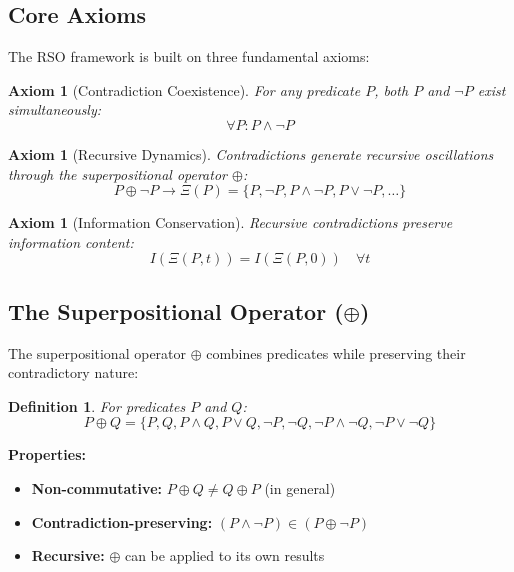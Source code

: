 \documentclass[11pt,a4paper]{article}
\newtheorem{definition}[theorem]{Definition}
\newtheorem{axiom}[theorem]{Axiom}
\begin{document}
\subsection{Core Axioms}

The RSO framework is built on three fundamental axioms:

\begin{axiom}[Contradiction Coexistence]
For any predicate $P$, both $P$ and $\neg P$ exist simultaneously:
\begin{equation}
\forall P: P \land \neg P
\end{equation}
\end{axiom}

\begin{axiom}[Recursive Dynamics]
Contradictions generate recursive oscillations through the superpositional operator $\oplus$:
\begin{equation}
P \oplus \neg P \rightarrow \Xi(P) = \{P, \neg P, P \land \neg P, P \lor \neg P, \ldots\}
\end{equation}
\end{axiom}

\begin{axiom}[Information Conservation]
Recursive contradictions preserve information content:
\begin{equation}
I(\Xi(P, t)) = I(\Xi(P, 0)) \quad \forall t
\end{equation}
\end{axiom}

\subsection{The Superpositional Operator ($\oplus$)}

The superpositional operator $\oplus$ combines predicates while preserving their contradictory nature:

\begin{definition}
For predicates $P$ and $Q$:
\begin{equation}
P \oplus Q = \{P, Q, P \land Q, P \lor Q, \neg P, \neg Q, \neg P \land \neg Q, \neg P \lor \neg Q\}
\end{equation}
\end{definition}

\textbf{Properties:}
\begin{itemize}
    \item \textbf{Non-commutative:} $P \oplus Q \neq Q \oplus P$ (in general)
    \item \textbf{Contradiction-preserving:} $(P \land \neg P) \in (P \oplus \neg P)$
    \item \textbf{Recursive:} $\oplus$ can be applied to its own results
\end{itemize}
\end{document}
